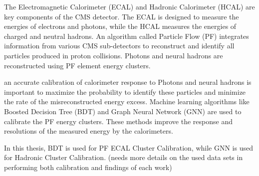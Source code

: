 The Electromagnetic Calorimeter (ECAL) and Hadronic Calorimeter (HCAL) are key components of the CMS detector. The ECAL is designed to measure the energies of electrons and photons, while the HCAL measures the energies of charged and neutral hadrons. An algorithm called Particle Flow (PF) integrates information from various CMS sub-detectors to reconstruct and identify all particles produced in proton collisions. Photons and neural hadrons are reconstructed using PF element energy clusters.

an accurate calibration of calorimeter response to Photons and neural hadrons is important to maximize the probability to identify these particles and minimize the rate of the misreconstructed energy excess. Machine learning algorithms like Boosted Decision Tree (BDT) and Graph Neural Network (GNN) are used to calibrate the PF energy clusters. These methods improve the response and resolutions of the measured energy by the calorimeters.

In this thesis, BDT is used for PF ECAL Cluster Calibration, while GNN is used for Hadronic Cluster Calibration. (needs more details on the used data sets in performing both calibration and findings of each work)





